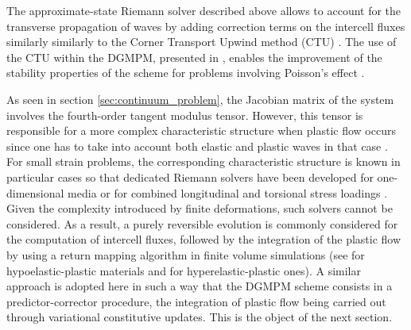 \begin{remark}
  The approximate-state Riemann solver described above allows to account for the transverse propagation of waves by adding correction terms on the intercell fluxes similarly similarly to the Corner Transport Upwind method (CTU) \cite{Colella_CTU}.
  The use of the CTU within the DGMPM, presented in \cite{DGMPM}, enables the improvement of the stability properties of the scheme for problems involving Poisson's effect \cite{Thesis}.
\end{remark}


As seen in section \ref{sec:continuum_problem}, the Jacobian matrix of the system involves the fourth-order tangent modulus tensor.
However, this tensor is responsible for a more complex characteristic structure when plastic flow occurs since one has to take into account both elastic and plastic waves in that case \cite{Wang}.
For small strain problems, the corresponding characteristic structure is known in particular cases so that dedicated Riemann solvers have been developed for one-dimensional media \cite{Thomas_EP} or for combined longitudinal and torsional stress loadings \cite{Lin_et_Ballman}.
Given the complexity introduced by finite deformations, such solvers cannot be considered.
As a result, a purely reversible evolution is commonly considered for the computation of intercell fluxes, followed by the integration of the plastic flow by using a return mapping algorithm in finite volume simulations (see \cite{FRRSE,Maire_elastoplast} for hypoelastic-plastic materials and \cite{Lee_FVM} for hyperelastic-plastic ones).
A similar approach is adopted here in such a way that the DGMPM scheme consists in a predictor-corrector procedure, the integration of plastic flow being carried out through variational constitutive updates.
This is the object of the next section.



